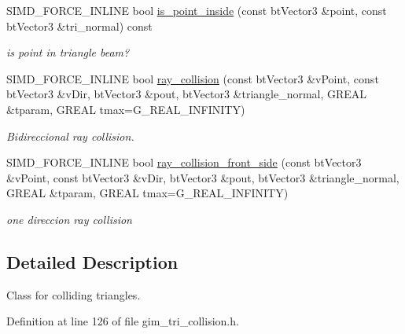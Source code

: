 \begin{CompactItemize}
\item 
SIMD\_\-FORCE\_\-INLINE bool \hyperlink{class_g_i_m___t_r_i_a_n_g_l_e_921acb2a97263653fce72384f177a953}{is\_\-point\_\-inside} (const btVector3 \&point, const btVector3 \&tri\_\-normal) const 
\begin{CompactList}\small\item\em is point in triangle beam? \item\end{CompactList}\item 
\hypertarget{class_g_i_m___t_r_i_a_n_g_l_e_2942ca686a994c2d112ad356c2a4e7ad}{
SIMD\_\-FORCE\_\-INLINE bool \hyperlink{class_g_i_m___t_r_i_a_n_g_l_e_2942ca686a994c2d112ad356c2a4e7ad}{ray\_\-collision} (const btVector3 \&vPoint, const btVector3 \&vDir, btVector3 \&pout, btVector3 \&triangle\_\-normal, GREAL \&tparam, GREAL tmax=G\_\-REAL\_\-INFINITY)}
\label{class_g_i_m___t_r_i_a_n_g_l_e_2942ca686a994c2d112ad356c2a4e7ad}

\begin{CompactList}\small\item\em Bidireccional ray collision. \item\end{CompactList}\item 
\hypertarget{class_g_i_m___t_r_i_a_n_g_l_e_2b333284fd573994acf89b9085a61927}{
SIMD\_\-FORCE\_\-INLINE bool \hyperlink{class_g_i_m___t_r_i_a_n_g_l_e_2b333284fd573994acf89b9085a61927}{ray\_\-collision\_\-front\_\-side} (const btVector3 \&vPoint, const btVector3 \&vDir, btVector3 \&pout, btVector3 \&triangle\_\-normal, GREAL \&tparam, GREAL tmax=G\_\-REAL\_\-INFINITY)}
\label{class_g_i_m___t_r_i_a_n_g_l_e_2b333284fd573994acf89b9085a61927}

\begin{CompactList}\small\item\em one direccion ray collision \item\end{CompactList}\end{CompactItemize}


\subsection{Detailed Description}
Class for colliding triangles. 

Definition at line 126 of file gim\_\-tri\_\-collision.h.

